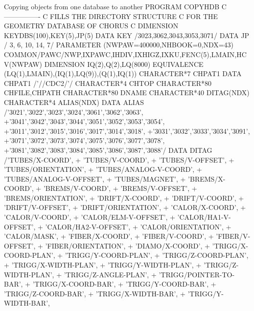 \begin{XMPt}{Copying objects from one database to another}
      PROGRAM COPYHDB
C     ----------------
C     FILLS THE DIRECTORY STRUCTURE
C     FOR THE GEOMETRY DATABASE OF CHORUS
C
      DIMENSION KEYDBS(100),KEY(5),JP(5)
      DATA KEY /3023,3062,3043,3053,3071/
      DATA JP  /   3,   6,  10,  14,   7/
      PARAMETER (NWPAW=400000,NHBOOK=0,NDX=43)
      COMMON/PAWC/NWP,IXPAWC,IHDIV,IXHIGZ,IXKU,FENC(5),LMAIN,HCV(NWPAW)
      DIMENSION IQ(2),Q(2),LQ(8000)
      EQUIVALENCE (LQ(1),LMAIN),(IQ(1),LQ(9)),(Q(1),IQ(1))
      CHARACTER*7 CHPAT1
      DATA CHPAT1 /'//CDC2/'/
      CHARACTER*4 CHTOP
      CHARACTER*80 CHFILE,CHPATH
      CHARACTER*80 DNAME
      CHARACTER*40 DITAG(NDX)
      CHARACTER*4  ALIAS(NDX)
      DATA ALIAS /'3021','3022','3023','3024','3061','3062','3063',
     +'3041','3042','3043','3044','3051','3052','3053','3054',
     +'3011','3012','3015','3016','3017','3014','3018',
     +'3031','3032','3033','3034','3091',
     +'3071','3072','3073','3074','3075','3076','3077','3078',
     +'3081','3082','3083','3084','3085','3086','3087','3088'/
      DATA DITAG /'TUBES/X-COORD',
     +            'TUBES/V-COORD',
     +            'TUBES/V-OFFSET',
     +            'TUBES/ORIENTATION',
     +            'TUBES/ANALOG-V-COORD',
     +            'TUBES/ANALOG-V-OFFSET',
     +            'TUBES/MAGNET',
     +            'BREMS/X-COORD',
     +            'BREMS/V-COORD',
     +            'BREMS/V-OFFSET',
     +            'BREMS/ORIENTATION',
     +            'DRIFT/X-COORD',
     +            'DRIFT/V-COORD',
     +            'DRIFT/V-OFFSET',
     +            'DRIFT/ORIENTATION',
     +            'CALOR/X-COORD',
     +            'CALOR/V-COORD',
     +            'CALOR/ELM-V-OFFSET',
     +            'CALOR/HA1-V-OFFSET',
     +            'CALOR/HA2-V-OFFSET',
     +            'CALOR/ORIENTATION',
     +            'CALOR/MASK',
     +            'FIBER/X-COORD',
     +            'FIBER/V-COORD',
     +            'FIBER/V-OFFSET',
     +            'FIBER/ORIENTATION',
     +            'DIAMO/X-COORD',
     +            'TRIGG/X-COORD-PLAN',
     +            'TRIGG/Y-COORD-PLAN',
     +            'TRIGG/Z-COORD-PLAN',
     +            'TRIGG/X-WIDTH-PLAN',
     +            'TRIGG/Y-WIDTH-PLAN',
     +            'TRIGG/Z-WIDTH-PLAN',
     +            'TRIGG/Z-ANGLE-PLAN',
     +            'TRIGG/POINTER-TO-BAR',
     +            'TRIGG/X-COORD-BAR',
     +            'TRIGG/Y-COORD-BAR',
     +            'TRIGG/Z-COORD-BAR',
     +            'TRIGG/X-WIDTH-BAR',
     +            'TRIGG/Y-WIDTH-BAR',

\end{XMPt}
